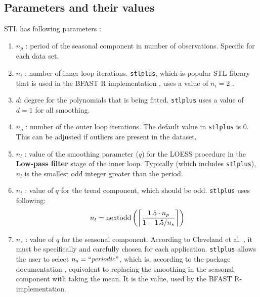 \documentclass[main.tex]{subfiles}
\begin{document}
\subsection{Parameters and their values}
\label{subsec:parameter_values}
STL has following parameters \cite{stl}:
\begin{enumerate}
\item $n_p$ : period of the seasonal component in number of observations.
  Specific for each data set.
\item $n_i$ : number of inner loop iterations. \texttt{stlplus}, which is
  popular STL library that is used in the BFAST R implementation \cite{bfast-github}, uses a
  value of $n_i = 2$ \cite{stlplus}.
\item $d$: degree for the polynomials that is being fitted.
  \texttt{stlplus} uses a value of $d=1$ for all smoothing.
\item $n_o$ : number of the outer loop iterations. The default value in
  \texttt{stlplus} is 0. This can be adjusted if outliers are present in the dataset.
\item $n_l$ : value of the smoothing parameter ($q$) for the LOESS procedure in the
  \textbf{Low-pass filter} stage of the inner loop. Typically (which includes
  \texttt{stlplus}), $n_l$ is the smallest odd integer greater than the period.
\item $n_t$ : value of $q$ for the trend component, which should be odd.
  \texttt{stlplus} uses following:
  \[
  n_t =\text{nextodd}\left(
  \ceil[\bigg]{
    \frac{1.5 \cdot n_p}
         {1-1.5/n_s}
  }
  \right)
  \]
\item $n_s$ : value of $q$ for the seasonal component. According to Cleveland
  et al. \cite{stl}, it must be specifically and
  carefully chosen for each application. \texttt{stlplus} allows
  the user to select $n_s = \text{``\emph{periodic}''}$, which is, according to
  the package documentation \cite{stlplus}, equivalent to replacing
  the smoothing in the seasonal component with taking the mean. It is the value,
  used by the BFAST R-implementation.
\end{enumerate}
\biblio
\end{document}
